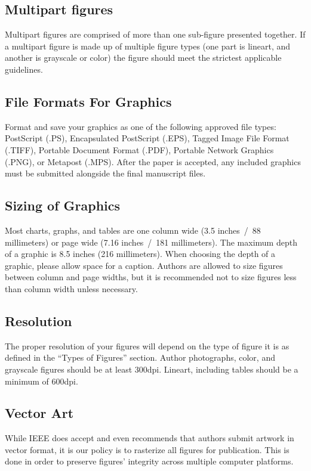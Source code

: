 \documentclass[journal,twoside,web]{ieeecolor}
\begin{document}
\subsection{Multipart figures}
Multipart figures are comprised of more than one sub-figure presented together.
If a multipart figure is made up of multiple figure types (one part is lineart,
and another is grayscale or color) the figure should meet the strictest applicable guidelines.

\subsection{File Formats For Graphics}
\label{formats}
Format and save your graphics as one of the following approved file types:
PostScript (.PS), Encapsulated PostScript (.EPS), Tagged Image File Format (.TIFF),
Portable Document Format (.PDF), Portable Network Graphics (.PNG), or Metapost (.MPS).
After the paper is accepted, any included graphics must be submitted alongside the final manuscript files.

\subsection{Sizing of Graphics}
Most charts, graphs, and tables are one column wide (3.5 inches~/~88 
millimeters) or page wide (7.16 inches~/~181 millimeters). The maximum
depth of a graphic is 8.5 inches (216 millimeters). When choosing the depth of a graphic,
please allow space for a caption. Authors are allowed to size figures between column and
page widths, but it is recommended not to size figures less than column width unless necessary. 

\subsection{Resolution}
The proper resolution of your figures will depend on the type of figure it 
is as defined in the ``Types of Figures'' section. Author photographs, 
color, and grayscale figures should be at least 300dpi. Lineart, including 
tables should be a minimum of 600dpi.

\subsection{Vector Art}
While IEEE does accept and even recommends that authors submit artwork
in vector format, it is our policy is to rasterize all figures for publication. This is done
in order to preserve figures' integrity across multiple computer platforms.
\end{document}
